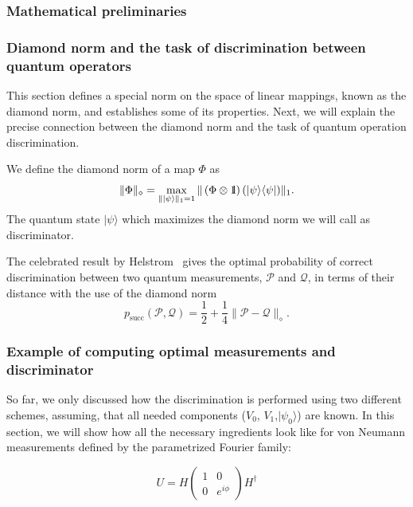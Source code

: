 \documentclass[preprint,12pt, a4paper]{elsarticle}
\newcommand{\ket}[1]{\ensuremath{|#1\rangle}}
\newcommand{\bra}[1]{\ensuremath{\langle#1|}}
\newcommand{\ketbra}[2]{\ensuremath{\ket{#1}\bra{#2}}}
\newcommand{\proj}[1]{\ensuremath{\ketbra{#1}{#1}}}
\newcommand{\1}{{\rm 1\hspace{-0.9mm}l}}
\newcommand{\PP}{\mathcal{P}}
\begin{document}
\subsubsection{Mathematical preliminaries}

%
%

\subsubsection{Diamond norm and the task of discrimination between quantum operators}
This section defines a special norm on the space of linear mappings, known as
the diamond norm, and establishes some of its properties.
Next, we will explain the precise connection between the diamond
norm and the task of quantum operation discrimination.


We define the diamond norm of a map $\Phi$ as
\begin{equation}
\|\Phi\|_\diamond = \max_{\| \ket{\psi}\|_1=1} \| \left(\Phi \otimes \1\right) (\proj{\psi}) \|_1.
\end{equation}
The quantum state $\ket{\psi}$ which maximizes the diamond norm we will call as discriminator.

The celebrated result by Helstrom~\cite{helstrom1976quantum} gives the optimal  probability of correct discrimination between two quantum measurements, $\PP$  and $\mathcal{Q}$,
in terms of their distance with the use of the diamond norm
\begin{equation}
p_{\text{succ}}(\PP, \mathcal{Q}) =  \frac12 + \frac14 \| \PP - \mathcal{Q} \|_\diamond.
\end{equation}

\subsubsection{Example of computing optimal measurements and discriminator}

So far, we only discussed how the discrimination is performed using two different
schemes, assuming, that all needed components ($V_0$, $V_1$,$\ket{\psi_0}$) are known.
In this section, we will show how all the necessary ingredients look like for
von Neumann measurements defined by the parametrized Fourier family:

\begin{equation}
	U = H
	\left(\begin{array}{cc}1&0\\0&e^{i \phi}\end{array}\right)  H^\dagger
\end{equation}
\end{document}
